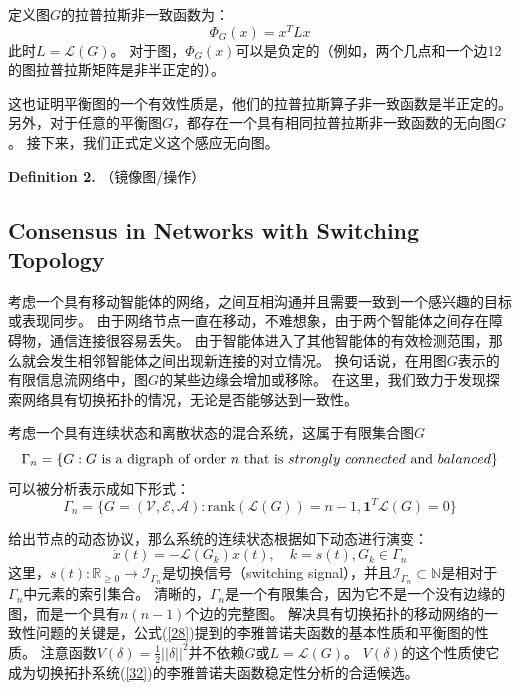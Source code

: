 \documentclass{article}
\begin{document}
定义图$G$的拉普拉斯非一致函数为：
\begin{equation}
    \Phi_G(x) = x^T Lx
    \tag{24}
\end{equation}
此时$L=\mathcal{L}(G)$。
对于图，$\Phi_G(x)$可以是负定的（例如，两个几点和一个边12的图拉普拉斯矩阵是非半正定的）。

这也证明平衡图的一个有效性质是，他们的拉普拉斯算子非一致函数是半正定的。
另外，对于任意的平衡图$G$，都存在一个具有相同拉普拉斯非一致函数的无向图$G$。
接下来，我们正式定义这个感应无向图。

\noindent \textbf{Definition 2.} （镜像图/操作）



\subsection{Consensus in Networks with Switching Topology}
考虑一个具有移动智能体的网络，之间互相沟通并且需要一致到一个感兴趣的目标或表现同步。
由于网络节点一直在移动，不难想象，由于两个智能体之间存在障碍物，通信连接很容易丢失。
由于智能体进入了其他智能体的有效检测范围，那么就会发生相邻智能体之间出现新连接的对立情况。
换句话说，在用图$G$表示的有限信息流网络中，图$G$的某些边缘会增加或移除。
在这里，我们致力于发现探索网络具有切换拓扑的情况，无论是否能够达到一致性。

考虑一个具有连续状态和离散状态的混合系统，这属于有限集合图$G$
\begin{equation}
    \Gamma_n = \{ G: G\ \text{is a digraph of order}\ n\ \text{that is}\ strongly\ connected\ \text{and}\ balanced \}
    \notag
\end{equation}
可以被分析表示成如下形式：
\begin{equation}
    \Gamma_n = \{ G=(\mathcal{V}, \mathcal{E}, \mathcal{A}): \text{rank}(\mathcal{L}(G)) =n-1, \mathbf{1}^T\mathcal{L}(G) = 0\}
    \tag{31}
    \label{31}
\end{equation}

给出节点的动态协议，那么系统的连续状态根据如下动态进行演变：
\begin{equation}
    \dot{x}(t) = -\mathcal{L}(G_k)x(t),\quad k=s(t), G_k\in \Gamma_n
    \tag{32}
    \label{32}
\end{equation}
这里，$s(t): \mathbb{R}_{\ge 0}\rightarrow \mathcal{I}_{\Gamma_n}$是切换信号（switching signal），并且$\mathcal{I}_{\Gamma_n}\subset \mathbb{N}$是相对于$\Gamma_n$中元素的索引集合。
清晰的，$\Gamma_n$是一个有限集合，因为它不是一个没有边缘的图，而是一个具有$n(n-1)$个边的完整图。
解决具有切换拓扑的移动网络的一致性问题的关键是，公式(\ref{28})提到的李雅普诺夫函数的基本性质和平衡图的性质。
注意函数$V(\delta)=\frac{1}{2}||\delta||^2$并不依赖$G$或$L=\mathcal{L}(G)$。
$V(\delta)$的这个性质使它成为切换拓扑系统(\ref{32})的李雅普诺夫函数稳定性分析的合适候选。
\end{document}
